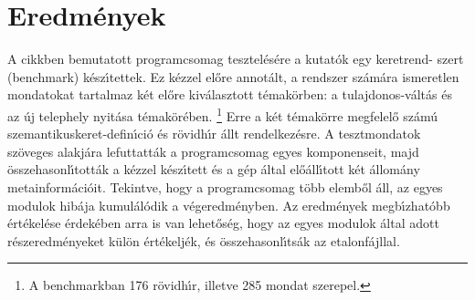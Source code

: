 \documentclass{llncs}
\begin{document}
\section{Eredm\'enyek}

A cikkben bemutatott programcsomag tesztel\'es\'ere a kutat\'ok egy keretrend- szert
(benchmark) k\'esz\'\i tettek. Ez k\'ezzel el\H{o}re annot\'alt, a rendszer
sz\'am\'ara ismeretlen mondatokat tartalmaz k\'et el\H{o}re kiv\'alasztott
t\'emak\"orben: a tulajdonos-v\'alt\'as \'es az \'uj telephely
nyit\'asa t\'emak\"or\'eben.
\footnote{A benchmarkban 176 r\"ovidh\'\i r, illetve 285 mondat szerepel.}
Erre a k\'et t\'emak\"orre megfelel\H{o} sz\'am\'u
szemantikuskeret-defin\'\i ci\'o \'es r\"ovidh\'\i r \'allt rendelkez\'esre.
A tesztmondatok sz\"oveges alakj\'ara lefuttatt\'ak a programcsomag egyes
komponenseit, majd \"osszehasonl\'\i tott\'ak a k\'ezzel k\'esz\'\i tett
\'es a g\'ep \'altal el\H{o}\'all\'\i tott k\'et \'allom\'any metainform\'aci\'oit.
Tekintve, hogy a programcsomag t\"obb elemb\H{o}l \'all, az egyes modulok hib\'aja
kumul\'al\'odik a v\'egeredm\'enyben. Az eredm\'enyek megb\'\i zhat\'obb
\'ert\'ekel\'ese \'erdek\'eben arra is van lehet\H{o}s\'eg, hogy az egyes
modulok \'altal adott r\'eszeredm\'enyeket k\"ul\"on \'ert\'ekelj\'ek, \'es
\"osszehasonl\'\i ts\'ak az etalonf\'ajllal.
\end{document}
